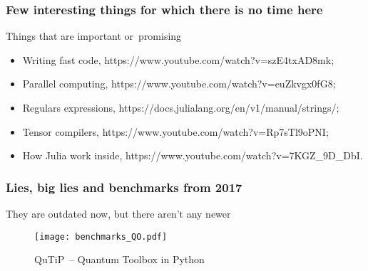 \documentclass[10pt,t]{beamer}
\begin{document}
\begin{frame}
  \frametitle{Few interesting things for which there is no time
    here}


  Things that are important or~promising
  \begin{itemize}

  \item Writing fast code,
    {https://www.youtube.com/watch?v=szE4txAD8mk};

  \item Parallel computing,
    {https://www.youtube.com/watch?v=euZkvgx0fG8};

  \item Regulars expressions,
    {https://docs.julialang.org/en/v1/manual/strings/};

  \item Tensor compilers,
    {https://www.youtube.com/watch?v=Rp7sTl9oPNI};

  \item How Julia work inside,
    {https://www.youtube.com/watch?v=7KGZ\_9D\_DbI}.

  \end{itemize}

\end{frame}





\begin{frame}
  \frametitle{Lies, big lies and benchmarks from 2017}


  {They are outdated now, but there aren't any newer}


  \begin{figure}

    \centering

    \texttt{[image: benchmarks\_QO.pdf]}

    \caption{QuTiP~-- Quantum Toolbox in Python}

  \end{figure}

\end{frame}
\end{document}
